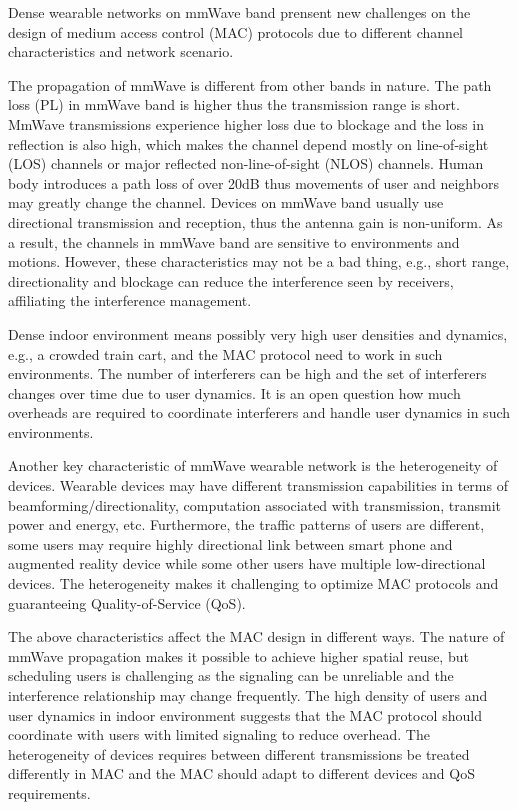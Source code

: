 \documentclass[10pt, conference, letterpaper]{IEEEtran}
\begin{document}
Dense wearable networks on mmWave band prensent new challenges on the design of medium access control (MAC) protocols due to different channel characteristics and network scenario. 

The propagation of mmWave is different from other bands in nature. 
The path loss (PL) in mmWave band is higher thus the transmission range is short. 
MmWave transmissions experience higher loss due to blockage and the loss in reflection is also high, which makes the channel depend mostly on line-of-sight (LOS) channels or major reflected non-line-of-sight (NLOS) channels.
Human body introduces a path loss of over 20dB \cite{humanshadowing} thus movements of user and neighbors may greatly change the channel.
Devices on mmWave band usually use directional transmission and reception, thus the antenna gain is non-uniform. As a result, the channels in mmWave band are sensitive to environments and motions. 
However, these characteristics may not be a bad thing, e.g., short range, directionality and blockage can reduce the interference seen by receivers, affiliating the interference management. 

Dense indoor environment means possibly very high user densities and dynamics, e.g., a crowded train cart, and the MAC protocol need to work in such environments.
The number of interferers can be high and the set of interferers changes over time due to user dynamics. 
It is an open question how much overheads are required to coordinate interferers and handle user dynamics in such environments.

Another key characteristic of mmWave wearable network is the heterogeneity of devices. 
Wearable devices may have different transmission capabilities in terms of beamforming/directionality, computation associated with transmission, transmit power and energy, etc. 
Furthermore, the traffic patterns of users are different, some users may require highly directional link between smart phone and augmented reality device while some other users have multiple low-directional devices. 
The heterogeneity makes it challenging to optimize MAC protocols and guaranteeing Quality-of-Service (QoS). 

The above characteristics affect the MAC design in different ways. 
The nature of mmWave propagation makes it possible to achieve higher spatial reuse, but scheduling users is challenging as the signaling can be unreliable and the interference relationship may change frequently. 
The high density of users and user dynamics in indoor environment suggests that the MAC protocol should coordinate with users with limited signaling to reduce overhead. 
The heterogeneity of devices requires between different transmissions be treated differently in MAC and the MAC should adapt to different devices and QoS requirements.
\end{document}
